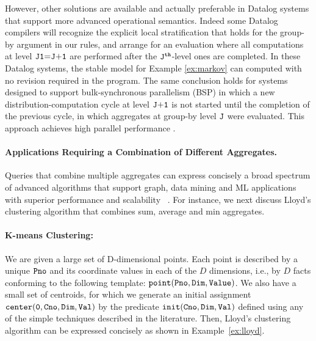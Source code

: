\documentclass[11pt]{article}
\def\inv{\vspace{-0.2cm}}
\def\inv{\vspace{-0.2cm}}
\begin{document}
However, other solutions are available and actually preferable 
in Datalog systems that support more advanced operational semantics.
 Indeed some Datalog compilers \cite{ldl++} will
recognize the explicit local stratification that holds for the
group-by argument in our rules, and arrange for an evaluation where  all computations at level
$\tt J1{=}J{+}1$ are performed after
the $\tt J^{th}$-level ones are completed. In these Datalog systems, the stable model for Example \ref{ex:markov} 
can computed with no revision required in the program.
The same conclusion holds for systems
 designed to support bulk-synchronous 
parallelism (BSP)  in which a new distribution-computation
cycle at level $\tt J{+}1$  is not started  until the completion of the previous 
cycle,  in which aggregates at group-by level $\tt J$ were evaluated. This approach achieves high parallel performance \cite{kddlog}.

\inv\inv\paragraph{\bf Applications  Requiring a Combination of Different Aggregates.}
 Queries that combine multiple aggregates 
can express concisely a  broad spectrum of advanced algorithms that support
graph, data mining and ML applications with superior performance and scalability
~\cite{seo2013socialite,wang2015asynchronous,bigdatalog,rasql,appl-iclp19,bigdatalog-mc,rasqldemoSigmod20,datalogml,kddlog}. 
For instance,  we next discuss  Lloyd's clustering algorithm  that combines sum, average and min aggregates.

\paragraph*{\bf K-means Clustering:}
 \label{sec:lloyd}
 We are given a large set of D-dimensional points.  
Each point is described by a unique $\tt Pno$ and its  coordinate values in each of the $D$
dimensions, i.e., by $D$ facts conforming to the following template: $\tt point(Pno, Dim, Value)$. 
We also have a small set of centroids,  for which we
generate an initial assignment $\tt center(0, Cno, Dim, Val)$ 
by the predicate $\tt init(Cno, Dim, Val)$  defined using  any of the
simple techniques described in the literature.  Then,  Lloyd's clustering 
algorithm can be expressed 
concisely as shown in  Example~\ref{ex:lloyd}. 
\end{document}
